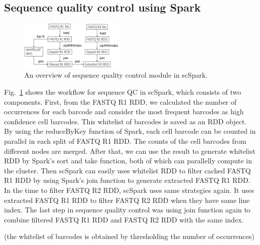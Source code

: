 \documentclass[conference]{IEEEtran}
\begin{document}

\subsection{Sequence quality control using Spark}
\begin{figure}
	\includegraphics[width=0.45\textwidth]{figure1.png}
	\caption{An overview of sequence quality control module in scSpark.} \label{fig1}
\end{figure}

Fig.~\ref{fig1} shows the workflow for sequence QC in scSpark, which consists of two components. 
First, from the FASTQ R1 RDD, we calculated the number of occurrences for each barcode and consider the most frequent barcodes as high confidence cell barcodes. This whitelist of barcodes is saved as an RDD object. 
By using the reduceByKey function of Spark, each cell barcode can be counted in parallel in each split of FASTQ R1 RDD. The counts of the cell barcodes from different nodes are merged. 
After that, we can use the result to generate whitelist RDD by Spark's sort and take function, both of which can parallelly compute in the cluster.
Then scSpark can easily uses whitelist RDD to filter cached FASTQ R1 RDD by using Spark's join function to generate extracted FASTQ R1 RDD.
In the time to filter FASTQ R2 RDD, scSpark uses same strategies again. 
It uses extracted FASTQ R1 RDD to filter FASTQ R2 RDD when they have same line index.
The last step in sequence quality control was using join function again to combine filtered FASTQ R1 RDD and FASTQ R2 RDD with the same index. 

(the whitelist of barcodes is obtained by thresholding the number of occurrences)
\end{document}
